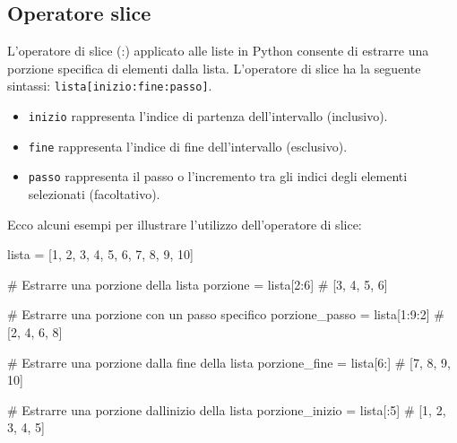 \documentclass[
  letterpaper,
  krantz2]{{[}./krantz{]}}
\newenvironment{Shaded}{\begin{snugshade}}{\end{snugshade}}
\newcommand{\CommentTok}[1]{\textcolor[rgb]{0.37,0.37,0.37}{#1}}
\newcommand{\DecValTok}[1]{\textcolor[rgb]{0.68,0.00,0.00}{#1}}
\newcommand{\NormalTok}[1]{\textcolor[rgb]{0.00,0.23,0.31}{#1}}
\newcommand{\OperatorTok}[1]{\textcolor[rgb]{0.37,0.37,0.37}{#1}}
\providecommand{\tightlist}{%
  \setlength{\itemsep}{0pt}\setlength{\parskip}{0pt}}\usepackage{longtable,booktabs,array}
\begin{document}
\subsection{Operatore slice}\label{operatore-slice}

L'operatore di slice (:) applicato alle liste in Python consente di
estrarre una porzione specifica di elementi dalla lista. L'operatore di
slice ha la seguente sintassi: \texttt{lista{[}inizio:fine:passo{]}}.

\begin{itemize}
\tightlist
\item
  \texttt{inizio} rappresenta l'indice di partenza dell'intervallo
  (inclusivo).
\item
  \texttt{fine} rappresenta l'indice di fine dell'intervallo
  (esclusivo).
\item
  \texttt{passo} rappresenta il passo o l'incremento tra gli indici
  degli elementi selezionati (facoltativo).
\end{itemize}

Ecco alcuni esempi per illustrare l'utilizzo dell'operatore di slice:

\begin{Shaded}
\begin{Highlighting}[]
\NormalTok{lista }\OperatorTok{=}\NormalTok{ [}\DecValTok{1}\NormalTok{, }\DecValTok{2}\NormalTok{, }\DecValTok{3}\NormalTok{, }\DecValTok{4}\NormalTok{, }\DecValTok{5}\NormalTok{, }\DecValTok{6}\NormalTok{, }\DecValTok{7}\NormalTok{, }\DecValTok{8}\NormalTok{, }\DecValTok{9}\NormalTok{, }\DecValTok{10}\NormalTok{]}

\CommentTok{\# Estrarre una porzione della lista}
\NormalTok{porzione }\OperatorTok{=}\NormalTok{ lista[}\DecValTok{2}\NormalTok{:}\DecValTok{6}\NormalTok{]  }\CommentTok{\# [3, 4, 5, 6]}

\CommentTok{\# Estrarre una porzione con un passo specifico}
\NormalTok{porzione\_passo }\OperatorTok{=}\NormalTok{ lista[}\DecValTok{1}\NormalTok{:}\DecValTok{9}\NormalTok{:}\DecValTok{2}\NormalTok{]  }\CommentTok{\# [2, 4, 6, 8]}

\CommentTok{\# Estrarre una porzione dalla fine della lista}
\NormalTok{porzione\_fine }\OperatorTok{=}\NormalTok{ lista[}\DecValTok{6}\NormalTok{:]  }\CommentTok{\# [7, 8, 9, 10]}

\CommentTok{\# Estrarre una porzione dall\textquotesingle{}inizio della lista}
\NormalTok{porzione\_inizio }\OperatorTok{=}\NormalTok{ lista[:}\DecValTok{5}\NormalTok{]  }\CommentTok{\# [1, 2, 3, 4, 5]}
\end{Highlighting}
\end{Shaded}
\end{document}
